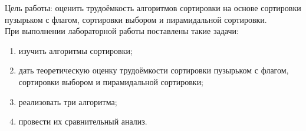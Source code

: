 \Introduction
Цель работы: оценить трудоёмкость алгоритмов сортировки на основе сортировки пузырьком с флагом, сортировки выбором и пирамидальной сортировки.\\
При выполнении лабораторной работы поставлены такие задачи:
\begin{enumerate}[1)]
	\item изучить алгоритмы сортировки;
	\item дать теоретическую оценку трудоёмкости сортировки пузырьком с флагом, сортировки выбором и пирамидальной сортировки;
	\item реализовать три алгоритма;
	\item провести их сравнительный анализ.
\end{enumerate}